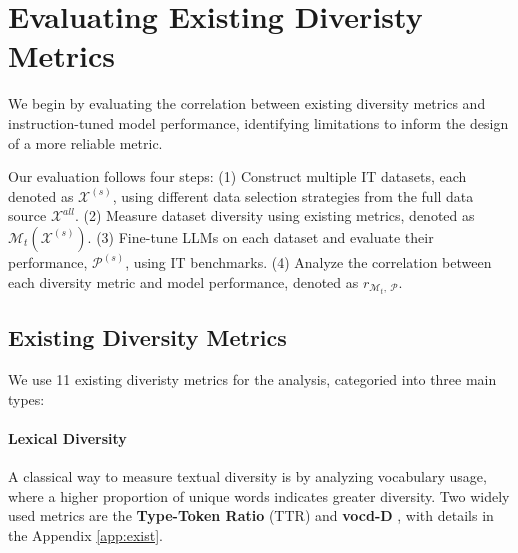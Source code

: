\section{Evaluating Existing Diveristy Metrics}
\label{sec:existing}
We begin by evaluating the correlation between existing diversity metrics and instruction-tuned model performance, identifying limitations to inform the design of a more reliable metric.

Our evaluation follows four steps: 
(1) Construct multiple IT datasets, each denoted as $\mathcal{X}^{(s)}$, using different data selection strategies from the full data source $\mathcal{X}^{all}$. 
(2) Measure dataset diversity using existing metrics, denoted as $\mathcal{M}_{t}(\mathcal{X}^{(s)})$. 
(3) Fine-tune LLMs on each dataset and evaluate their performance, $\mathcal{P}^{(s)}$, using IT benchmarks.
(4) Analyze the correlation between each diversity metric and model performance, denoted as $r_{\mathcal{M}_{t},\ \mathcal{P}}$.

\subsection{Existing Diversity Metrics}
We use 11 existing diveristy metrics for the analysis, categoried into three main types:

\paragraph{Lexical Diversity}  
A classical way to measure textual diversity is by analyzing vocabulary usage, where a higher proportion of unique words indicates greater diversity. Two widely used metrics are the \textbf{Type-Token Ratio} (TTR) \cite{richards1987type-TTR} and \textbf{vocd-D} \cite{malvern2004lexical-vocd}, with details in the Appendix \ref{app:exist}.

